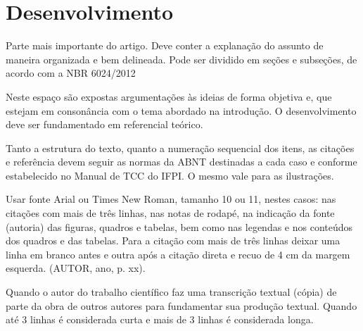 \vspace*{1cm}
\chapter{Desenvolvimento} \label{chap:estrutura}

Parte mais importante do artigo. Deve conter a explanação do assunto de maneira organizada e bem delineada. Pode ser dividido em seções e subseções, de acordo com a NBR 6024/2012 \cite[p. 33]{sperandio}

Neste espaço são expostas argumentações às ideias de forma objetiva e, que estejam em consonância com o tema abordado na introdução. O desenvolvimento deve ser fundamentado em referencial teórico.

Tanto a estrutura do texto, quanto a numeração sequencial dos itens, as citações e referência devem seguir as normas da ABNT destinadas a cada caso e conforme estabelecido no Manual de TCC do 
IFPI. O mesmo vale para as ilustrações.

\begin{citacao}
Usar fonte Arial ou Times New Roman, tamanho 10 ou 11, nestes casos: nas citações com mais de três linhas, nas notas de rodapé, na indicação da fonte (autoria) das figuras, quadros e tabelas, bem como nas legendas e nos 
conteúdos dos quadros e das tabelas. Para a citação com mais de três linhas deixar uma linha em branco antes e outra após a citação direta e recuo de 4 cm da margem esquerda. (AUTOR, ano, p. xx).
\end{citacao}

Quando o autor do trabalho científico faz uma transcrição textual (cópia) de parte da obra de outros autores para fundamentar sua produção textual. Quando até 3 linhas é considerada curta e mais de 3 linhas é considerada longa.

